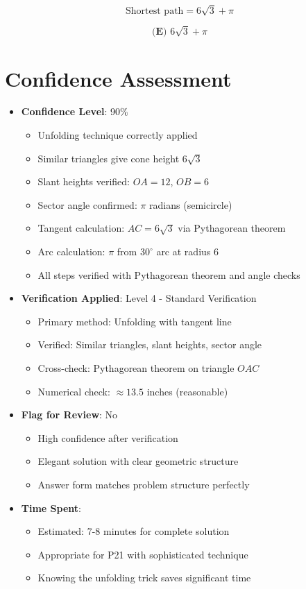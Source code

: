\documentclass[12pt]{article}
\begin{document}
$$\text{Shortest path} = 6\sqrt{3} + \pi$$

$$\boxed{\textbf{(E) } 6\sqrt{3} + \pi}$$

\section*{Confidence Assessment}
\begin{itemize}[leftmargin=*]
    \item \textbf{Confidence Level}: 90\% 
    \begin{itemize}
        \item Unfolding technique correctly applied
        \item Similar triangles give cone height $6\sqrt{3}$
        \item Slant heights verified: $OA = 12$, $OB = 6$
        \item Sector angle confirmed: $\pi$ radians (semicircle)
        \item Tangent calculation: $AC = 6\sqrt{3}$ via Pythagorean theorem
        \item Arc calculation: $\pi$ from $30^\circ$ arc at radius 6
        \item All steps verified with Pythagorean theorem and angle checks
    \end{itemize}
    \item \textbf{Verification Applied}: Level 4 - Standard Verification
    \begin{itemize}
        \item Primary method: Unfolding with tangent line
        \item Verified: Similar triangles, slant heights, sector angle
        \item Cross-check: Pythagorean theorem on triangle $OAC$
        \item Numerical check: $\approx 13.5$ inches (reasonable)
    \end{itemize}
    \item \textbf{Flag for Review}: No
    \begin{itemize}
        \item High confidence after verification
        \item Elegant solution with clear geometric structure
        \item Answer form matches problem structure perfectly
    \end{itemize}
    \item \textbf{Time Spent}: 
    \begin{itemize}
        \item Estimated: 7-8 minutes for complete solution
        \item Appropriate for P21 with sophisticated technique
        \item Knowing the unfolding trick saves significant time
    \end{itemize}
\end{itemize}
\end{document}
